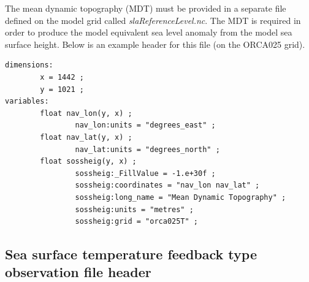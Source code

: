 The mean dynamic
topography (MDT) must be provided in a separate file defined on the model grid
 called {\it slaReferenceLevel.nc}. The MDT is required in
order to produce the model equivalent sea level anomaly from the model sea
surface height. Below is an example header for this file (on the ORCA025 grid).

\begin{alltt}
\tiny
\begin{verbatim}
dimensions:
        x = 1442 ;
        y = 1021 ;
variables:
        float nav_lon(y, x) ;
                nav_lon:units = "degrees_east" ;
        float nav_lat(y, x) ;
                nav_lat:units = "degrees_north" ;
        float sossheig(y, x) ;
                sossheig:_FillValue = -1.e+30f ;
                sossheig:coordinates = "nav_lon nav_lat" ;
                sossheig:long_name = "Mean Dynamic Topography" ;
                sossheig:units = "metres" ;
                sossheig:grid = "orca025T" ;
\end{verbatim}
\end{alltt}

\subsection{Sea surface temperature feedback type observation file header}

